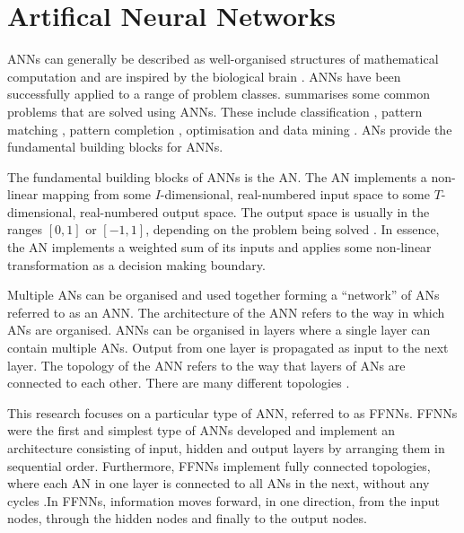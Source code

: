 \section{Artifical Neural Networks}
\label{sec:anns}

\acp{ANN} can generally be described as well-organised structures of mathematical computation and are inspired by the biological brain  \cite{ref:engelbrecht:2007}. \acp{ANN} have been successfully applied to a range of problem classes.  \citeauthor{ref:engelbrecht:2007}  \cite{ref:engelbrecht:2007} summarises some common problems that are solved using \acp{ANN}. These include classification  \cite{ref:khan:2001}, pattern matching  \cite{ref:cannady:1998, ref:kumar:1994}, pattern completion  \cite{ref:dayhoff:2001}, optimisation  \cite{ref:specht:1991} and data mining  \cite{ref:singh:2009}. \Acp{AN} provide the fundamental building blocks for \acp{ANN}.

The fundamental building blocks of \acp{ANN} is the \acs{AN}. The \acs{AN} implements a non-linear mapping from some $I$-dimensional, real-numbered input space to some $T$-dimensional, real-numbered output space. The output space is usually in the ranges $[0,1]$ or $[-1,1]$, depending on the problem being solved \cite{ref:engelbrecht:2007}. In essence, the \acs{AN} implements a weighted sum of its inputs and applies some non-linear transformation as a decision making boundary.

Multiple \acp{AN} can be organised and used together forming a ``network'' of \acp{AN} referred to as an \acf{ANN}. The architecture of the \acs{ANN} refers to the way in which \acp{AN} are organised. \acp{ANN} can be organised in layers where a single layer can contain multiple \acp{AN}. Output from one layer is propagated as input to the next layer. The topology of the \acs{ANN} refers to the way that layers of \acp{AN} are connected to each other. There are many different topologies  \cite{ref:miikkulainen:2010}.

This research focuses on a particular type of \acs{ANN}, referred to as \acp{FFNN}. \acp{FFNN} were the first and simplest type of \acp{ANN} developed  \cite{ref:schmidhuber:2015} and implement an architecture consisting of input, hidden and output layers by arranging them in sequential order. Furthermore, \acp{FFNN} implement fully connected topologies, where each \acs{AN} in one layer is connected to all \acp{AN} in the next, without any cycles  \cite{ref:zell:1994}.In \acp{FFNN}, information moves forward, in one direction, from the input nodes, through the hidden nodes and finally to the output nodes.

